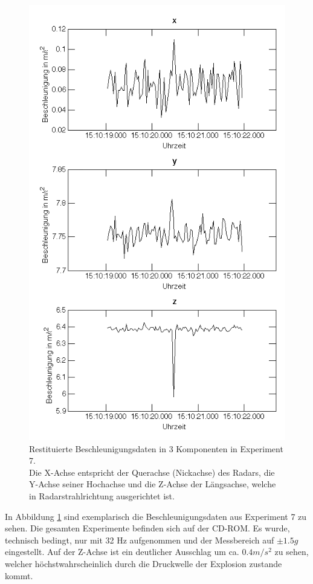 \documentclass[12pt,a4paper,twoside,BCOR=12.5mm]{scrartcl}
\begin{document}
\begin{figure}[H]
\centering
\includegraphics[scale=.6]{wakiki/firstexample2.png}
\caption{Restituierte Beschleunigungsdaten in 3 Komponenten in Experiment 7.\\ Die X-Achse entspricht der Querachse (Nickachse) des Radars, die Y-Achse seiner Hochachse und die Z-Achse der Längsachse, welche in Radarstrahlrichtung ausgerichtet ist. }
\label{firstexample}
\end{figure}

In Abbildung \ref{firstexample} sind exemplarisch die Beschleunigungsdaten aus Experiment 7 zu sehen. Die gesamten Experimente befinden sich auf der CD-ROM. Es wurde, technisch bedingt, nur mit 32 Hz aufgenommen und der Messbereich auf $\pm 1.5g$ eingestellt. Auf der Z-Achse ist ein deutlicher Ausschlag um ca. $0.4 m/s^2$ zu sehen, welcher höchstwahrscheinlich durch die Druckwelle der Explosion zustande kommt. 
\end{document}
